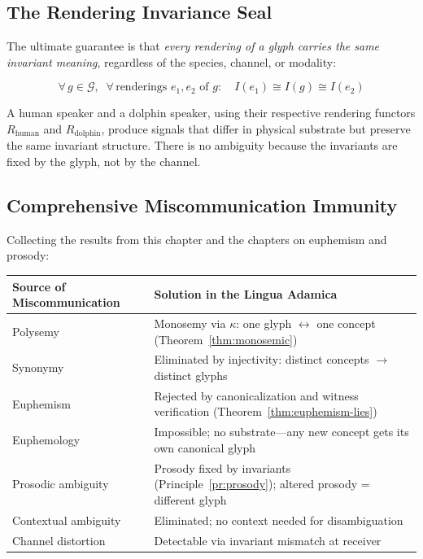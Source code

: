 \documentclass[12pt, letterpaper]{book}
\def\mathfrak#1{#1}%
\begin{document}
\subsection{The Rendering Invariance Seal}

The ultimate guarantee is that \textit{every rendering of a glyph carries the same invariant meaning}, regardless of the species, channel, or modality:

\[
\boxed{\forall\, \mathfrak{g} \in \mathcal{G},\;\; \forall\, \text{renderings } e_1, e_2 \text{ of } \mathfrak{g}: \quad I(e_1) \cong I(\mathfrak{g}) \cong I(e_2)}
\]

A human speaker and a dolphin speaker, using their respective rendering functors $R_{\mathrm{human}}$ and $R_{\mathrm{dolphin}}$, produce signals that differ in physical substrate but preserve the same invariant structure. There is no ambiguity because the invariants are fixed by the glyph, not by the channel.

\subsection{Comprehensive Miscommunication Immunity}

Collecting the results from this chapter and the chapters on euphemism and prosody:

\begin{center}
\begin{tabular}{lp{9cm}}
\toprule
\textbf{Source of Miscommunication} & \textbf{Solution in the Lingua Adamica} \\
\midrule
Polysemy & Monosemy via $\kappa$: one glyph $\leftrightarrow$ one concept (Theorem~\ref{thm:monosemic}) \\
Synonymy & Eliminated by injectivity: distinct concepts $\to$ distinct glyphs \\
Euphemism & Rejected by canonicalization and witness verification (Theorem~\ref{thm:euphemism-lies}) \\
Euphemology & Impossible; no substrate---any new concept gets its own canonical glyph \\
Prosodic ambiguity & Prosody fixed by invariants (Principle~\ref{pr:prosody}); altered prosody = different glyph \\
Contextual ambiguity & Eliminated; no context needed for disambiguation \\
Channel distortion & Detectable via invariant mismatch at receiver \\
\bottomrule
\end{tabular}
\end{center}
\end{document}
